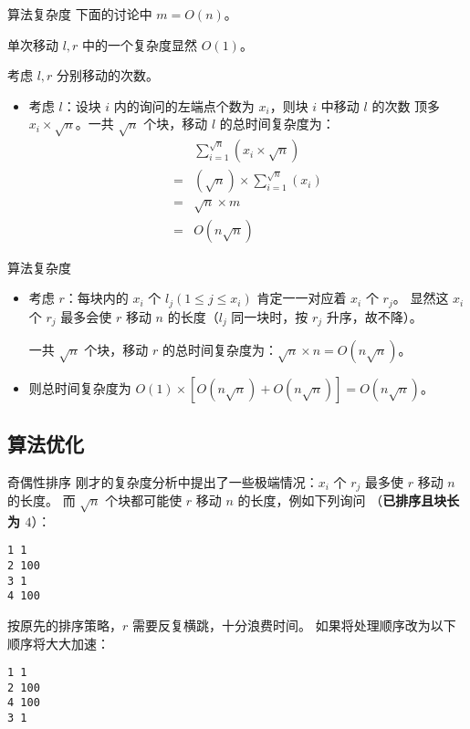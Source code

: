 \documentclass[table]{beamer}
\begin{document}
\begin{frame}{算法复杂度}
	下面的讨论中 $m=O(n)$。
	
	单次移动 $l,r$ 中的一个复杂度显然 $O(1)$。
	\pause

	考虑 $l,r$ 分别移动的次数。
	\pause

	\begin{itemize}
		\item 考虑 $l$：设块 $i$ 内的询问的左端点个数为 $x_i$，则块 $i$ 中移动 $l$ 的次数
		顶多 $x_i\times\sqrt{n}$。一共 $\sqrt{n}$ 个块，移动 $l$ 的总时间复杂度为：
		$$\begin{aligned}
			&\sum_{i=1}^{\sqrt{n}} \left(x_i\times\sqrt{n}\right)\\
			=&\left(\sqrt{n}\right)\times\sum_{i=1}^{\sqrt{n}} \left(x_i\right)\\
			=&\sqrt{n}\times m\\
			=&O(n\sqrt{n})
		\end{aligned}$$
	\end{itemize}
\end{frame}
\begin{frame}{算法复杂度}
	\begin{itemize}
		\item 考虑 $r$：每块内的 $x_i$ 个 $l_j(1\le j\le x_i)$ 肯定一一对应着 $x_i$ 个 $r_j$。
		显然这 $x_i$ 个 $r_j$ 最多会使 $r$ 移动 $n$ 的长度（$l_j$ 同一块时，按 $r_j$ 升序，故不降）。

		一共 $\sqrt{n}$ 个块，移动 $r$ 的总时间复杂度为：$\sqrt{n}\times n=O(n\sqrt{n})$。
		\pause

		\item 则总时间复杂度为 $O(1)\times [O(n\sqrt{n})+O(n\sqrt{n})]=O(n\sqrt{n})$。
	\end{itemize}
\end{frame}

\subsection{算法优化}

\begin{frame}[fragile]{奇偶性排序}
	刚才的复杂度分析中提出了一些极端情况：$x_i$ 个 $r_j$ 最多使 $r$ 移动 $n$ 的长度。
	而 $\sqrt{n}$ 个块都可能使 $r$ 移动 $n$ 的长度，例如下列询问
	（\textbf{已排序且块长为 $4$}）：
\begin{verbatim}
1 1
2 100
3 1
4 100
\end{verbatim}
	\pause
	按原先的排序策略，$r$ 需要反复横跳，十分浪费时间。
	如果将处理顺序改为以下顺序将大大加速：
\begin{verbatim}
1 1
2 100
4 100
3 1
\end{verbatim}

\end{frame}
\end{document}
